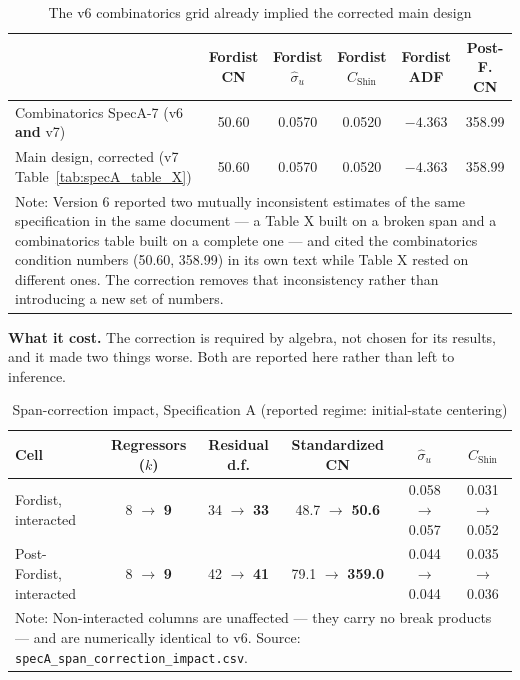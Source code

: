 \documentclass[11pt,a4paper]{article}
\begin{document}
\begin{table}[H]
\centering
\caption{The v6 combinatorics grid already implied the corrected main design}
\label{tab:specA_span_corroboration}
\small
\begin{tabular}{p{6.0cm}ccccc}
\toprule
 & Fordist CN & Fordist $\hat{\sigma}_u$ & Fordist $C_{\text{Shin}}$ & Fordist ADF & Post-F. CN \\
\midrule
Combinatorics SpecA-7 (v6 \textbf{and} v7) & 50.60 & 0.0570 & 0.0520 & $-4.363$ & 358.99 \\
Main design, corrected (v7 Table~\ref{tab:specA_table_X}) & 50.60 & 0.0570 & 0.0520 & $-4.363$ & 358.99 \\
\bottomrule
\multicolumn{6}{p{15.5cm}}{\footnotesize Note: Version 6 reported two mutually inconsistent estimates of the same specification in the same document --- a Table X built on a broken span and a combinatorics table built on a complete one --- and cited the combinatorics condition numbers (50.60, 358.99) in its own text while Table X rested on different ones. The correction removes that inconsistency rather than introducing a new set of numbers.}
\end{tabular}
\end{table}

\textbf{What it cost.} The correction is required by algebra, not chosen for its results, and it made two things worse. Both are reported here rather than left to inference.

\begin{table}[H]
\centering
\caption{Span-correction impact, Specification A (reported regime: initial-state centering)}
\label{tab:specA_span_impact}
\small
\begin{tabular}{p{4.6cm}ccccc}
\toprule
Cell & Regressors ($k$) & Residual d.f. & Standardized CN & $\hat{\sigma}_u$ & $C_{\text{Shin}}$ \\
\midrule
Fordist, interacted & 8 $\to$ \textbf{9} & 34 $\to$ \textbf{33} & 48.7 $\to$ \textbf{50.6} & 0.058 $\to$ 0.057 & 0.031 $\to$ 0.052 \\
Post-Fordist, interacted & 8 $\to$ \textbf{9} & 42 $\to$ \textbf{41} & 79.1 $\to$ \textbf{359.0} & 0.044 $\to$ 0.044 & 0.035 $\to$ 0.036 \\
\bottomrule
\multicolumn{6}{p{15.5cm}}{\footnotesize Note: Non-interacted columns are unaffected --- they carry no break products --- and are numerically identical to v6. Source: \texttt{specA\_span\_correction\_impact.csv}.}
\end{tabular}
\end{table}
\end{document}
